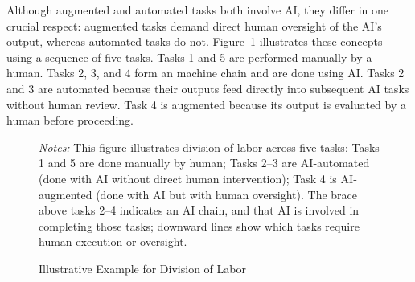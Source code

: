 \documentclass{article}
\theoremstyle{plain}
\theoremstyle{plain}
\begin{document}
Although augmented and automated tasks both involve AI, they differ in one crucial respect: augmented tasks demand direct human oversight of the AI’s output, whereas automated tasks do not.
Figure~\ref{fig:task_division} illustrates these concepts using a sequence of five tasks.  
Tasks 1 and 5 are performed manually by a human.  
Tasks 2, 3, and 4 form an machine chain and are done using AI.
Tasks 2 and 3 are automated because their outputs feed directly into subsequent AI tasks without human review.
Task 4 is augmented because its output is evaluated by a human before proceeding. 
\begin{figure}[ht]
  \begin{center}
  \caption{Illustrative Example for Division of Labor}
  \label{fig:task_division}
  \end{center}
  \footnotesize{
  \emph{Notes:} This figure illustrates division of labor across five tasks: Tasks 1 and 5 are done manually by human; Tasks 2--3 are AI‐automated (done with AI without direct human intervention); Task 4 is AI‐augmented (done with AI but with human oversight). The brace above tasks 2--4 indicates an AI chain, and that AI is involved in completing those tasks; downward lines show which tasks require human execution or oversight. 
  }
\end{figure}
\end{document}
